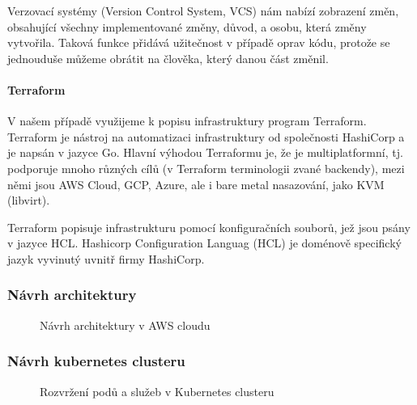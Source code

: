 \documentclass[thesis=M,czech]{FITthesis}[2019/12/23]
\theoremstyle{plain}
\theoremstyle{definition}
\begin{document}
Verzovací systémy (Version Control System, VCS) nám nabízí zobrazení změn, obsahující všechny implementované změny, důvod, a osobu, která změny vytvořila. Taková funkce přidává užitečnost v případě oprav kódu, protože se jednouduše můžeme obrátit na člověka, který danou část změnil. 

\paragraph{Terraform}

V našem případě využijeme k popisu infrastruktury program Terraform. Terraform je nástroj na automatizaci infrastruktury od společnosti HashiCorp a je napsán v jazyce Go. Hlavní výhodou Terraformu je, že je multiplatformní, tj. podporuje mnoho různých cílů (v Terraform terminologii zvané backendy), mezi němi jsou AWS Cloud, GCP, Azure, ale i bare metal nasazování, jako KVM (libvirt).


Terraform popisuje infrastrukturu pomocí konfiguračních souborů, jež jsou psány v jazyce HCL. Hashicorp Configuration Languag (HCL) je doménově specifický jazyk vyvinutý uvnitř firmy HashiCorp.

\subsubsection{Návrh architektury}


\begin{figure}[H]\centering
	

	\caption[Návrh architektury v AWS cloudu]{Návrh architektury v AWS cloudu}\label{fig:float}
\end{figure}


\subsubsection{Návrh kubernetes clusteru}

\begin{figure}[H]\centering
	

	\caption[Rozvržení podů a služeb v Kubernetes clusteru]{Rozvržení podů a služeb v Kubernetes clusteru}\label{fig:float}
\end{figure}




\end{document}
